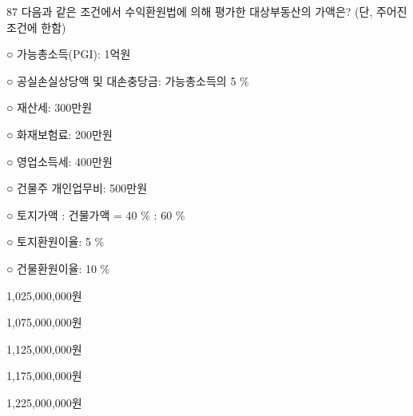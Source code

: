 \begin{question}{87}
다음과 같은 조건에서 수익환원법에 의해 평가한 대상부동산의 가액은? (단, 주어진 조건에 한함)
\begin{framedtext}
○ 가능총소득(PGI): 1억원 \par
○ 공실손실상당액 및 대손충당금: 가능총소득의 5 \% \par
○ 재산세: 300만원 \par
○ 화재보험료: 200만원 \par
○ 영업소득세: 400만원 \par
○ 건물주 개인업무비: 500만원 \par
○ 토지가액 : 건물가액 = 40 \% : 60 \% \par
○ 토지환원이율: 5 \% \par
○ 건물환원이율: 10 \% \par
\end{framedtext}
\begin{choices}
  \item 1,025,000,000원
  \item 1,075,000,000원
  \item 1,125,000,000원
  \item 1,175,000,000원
  \item 1,225,000,000원
\end{choices}
\end{question}
